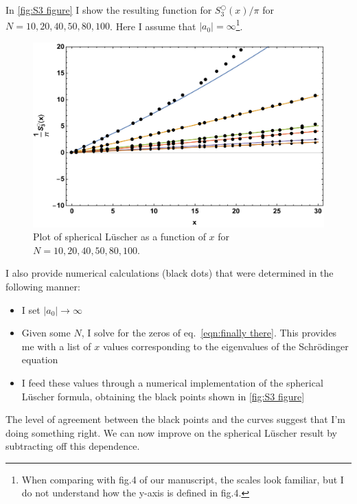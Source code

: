 \documentclass[11pt]{article}
\begin{document}
In \autoref{fig:S3 figure} I show the resulting function for $S^\bigcirc_3(x)/\pi$ for $N=10,20,40,50,80,100$.  Here I assume that $|a_0|=\infty$\footnote{When comparing with fig.4 of our manuscript, the scales look familiar, but I do not understand how the y-axis is defined in fig.4.}.
\begin{figure}
\includegraphics[width=\textwidth]{figs/S3_figure.pdf}
\caption{Plot of spherical L\"uscher as a function of $x$ for $N=10,20,40,50,80,100$.  \label{fig:S3 figure}}
\end{figure}
I also provide numerical calculations (black dots) that were determined in the following manner:
\begin{itemize}
\item I set $|a_0|\to\infty$
\item Given some $N$, I solve for the zeros of eq.~\eqref{eqn:finally there}.  This provides me with a list of $x$ values corresponding to the eigenvalues of the Schr\"odinger equation
\item I feed these values through a numerical implementation of the spherical L\"uscher formula, obtaining the black points shown in \autoref{fig:S3 figure}
\end{itemize}
The level of agreement between the black points and the curves suggest that I'm doing something right.  We can now improve on the spherical L\"uscher result by subtracting off this dependence.


%
\end{document}
